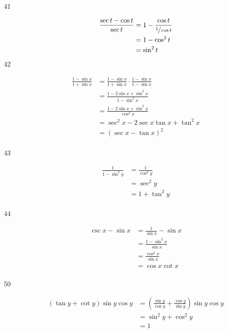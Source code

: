 \documentclass{exam}
\begin{document}
\begin{description}
      \item[41] 
        \begin{align*}
          \frac{\sec t - \cos t}{\sec t} & = 1 - \frac{\cos t}{\sfrac{1}{\cos t}} \\
                                         & = 1 - \cos^2 t \\
                                         & = \sin^2 t \\
        \end{align*}

      \item[42] 
        \begin{align*}
          \frac{1 - \sin x}{1 + \sin x} & = \frac{1 - \sin x}{1 + \sin x} \cdot \frac{1 - \sin x}{1 - \sin x} \\
                                        & = \frac{1 - 2 \sin x + \sin^2 x}{1 - \sin^2 x} \\
                                        & = \frac{1 - 2 \sin x + \sin^2 x}{\cos^2 x} \\
                                        & = \sec^2 x - 2 \sec x \tan x + \tan^2 x \\
                                        & = (\sec x - \tan x)^2 \\
        \end{align*}

      \item[43] 
        \begin{align*}
          \frac{1}{1 - \sin^2 y} & = \frac{1}{\cos^2 y} \\
                                 & = \sec^2 y \\
                                 & = 1 + \tan^2 y \\
        \end{align*}

      \item[44] 
        \begin{align*}
          \csc x - \sin x & = \frac{1}{\sin x} - \sin x \\
                          & = \frac{1 - \sin^2 x}{\sin x} \\
                          & = \frac{\cos^2 x}{\sin x} \\
                          & = \cos x \cot x \\
        \end{align*}

      \item[50] 
        \begin{align*}
          (\tan y + \cot y) \sin y \cos y & = \left( \frac{\sin y}{\cos y} + \frac{\cos y}{\sin y} \right) \sin y \cos y \\
                                          & = \sin^2 y + \cos^2 y \\
                                          & = 1 \\
        \end{align*}


\end{description}
\end{document}
